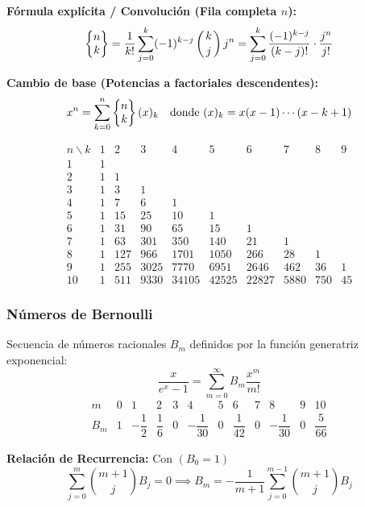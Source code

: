 
\textbf{Fórmula explícita / Convolución (Fila completa $n$):}
\[
\stirlingsecond{n}{k} = \frac{1}{k!} \sum_{j=0}^k (-1)^{k-j} \binom{k}{j} j^n = \sum_{j=0}^k \frac{(-1)^{k-j}}{(k-j)!} \cdot \frac{j^n}{j!}
\]


\textbf{Cambio de base (Potencias a factoriales descendentes):}
\[
x^n = \sum_{k=0}^n \left\{ \begin{matrix} n \\ k \end{matrix} \right\} (x)_k \quad \text{donde } (x)_k = x(x-1)\cdots(x-k+1)
\]

\[
\begin{array}{c|ccccccccc}
n \backslash k & 1 & 2 & 3 & 4 & 5 & 6 & 7 & 8 & 9 \\
\hline
1 & 1 & & & & & & & &  \\
2 & 1 & 1 & & & & & & &  \\
3 & 1 & 3 & 1 & & & & & &  \\
4 & 1 & 7 & 6 & 1 & & & & &  \\
5 & 1 & 15 & 25 & 10 & 1 & & & &  \\
6 & 1 & 31 & 90 & 65 & 15 & 1 & & &  \\
7 & 1 & 63 & 301 & 350 & 140 & 21 & 1 & &  \\
8 & 1 & 127 & 966 & 1701 & 1050 & 266 & 28 & 1 &  \\
9 & 1 & 255 & 3025 & 7770 & 6951 & 2646 & 462 & 36 & 1 \\
10 & 1 & 511 & 9330 & 34105 & 42525 & 22827 & 5880 & 750 & 45 
\end{array}
\]
\subsubsection{Números de Bernoulli}

Secuencia de números racionales $B_m$ definidos por la función generatriz exponencial:
\[
\frac{x}{e^x - 1} = \sum_{m=0}^\infty B_m \frac{x^m}{m!}
\]
\[
\begin{array}{c|ccccccccccc}
m & 0 & 1 & 2 & 3 & 4 & 5 & 6 & 7 & 8 & 9 & 10 \\
\hline
B_m & 1 & -\dfrac{1}{2} & \dfrac{1}{6} & 0 & -\dfrac{1}{30} & 0 & \dfrac{1}{42} & 0 & -\dfrac{1}{30} & 0 & \dfrac{5}{66}
\end{array}
\]

\textbf{Relación de Recurrencia:} Con $(B_0 = 1)$
\[
\sum_{j=0}^m \binom{m+1}{j} B_j = 0 \implies B_m = -\frac{1}{m+1} \sum_{j=0}^{m-1} \binom{m+1}{j} B_j 
\]

